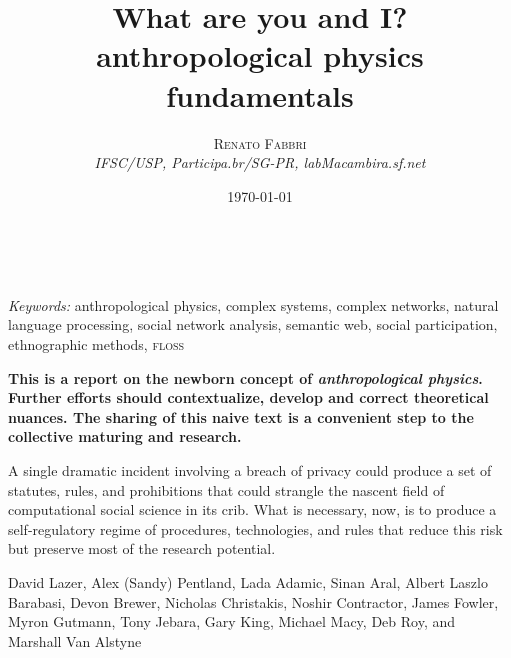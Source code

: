 \documentclass[a4paper, 11pt]{article} %
\title{\textbf{What are you and I?}\\ %
anthropological physics fundamentals} %
\author{\textsc{Renato Fabbri} %
\\{\textit{IFSC/USP, Participa.br/SG-PR, labMacambira.sf.net}}} %
\date{\today} %
\makeatletter
\newcommand{\floss}{\textsc{floss}}
\renewcommand{\maketitle}{ %
\begin{flushright} %
{\LARGE\@title} %

\vspace{50pt} %

{\large\@author} %
\\\@date %

\vspace{40pt} %
\end{flushright}
}
\makeatother
\begin{document}
\maketitle %



%
%
%

\hspace*{3,6mm}\textit{Keywords:} anthropological physics, complex systems, complex networks, natural language processing, social network analysis, semantic web, social participation, ethnographic methods, \floss


\vspace*{1cm}
{\bf This is a report on the newborn concept of \emph{anthropological physics}. Further efforts should contextualize, develop and correct theoretical nuances. The sharing of this naive text is a convenient step to the collective maturing and research.}
\vspace*{.6cm}

\newpage
\epigraph{A single dramatic incident involving a breach of privacy could produce a set of statutes, rules, and prohibitions that could strangle the nascent field of computational social science in its crib. What is necessary, now, is to produce a self-regulatory regime of procedures, technologies, and rules that reduce this risk but preserve most of the research potential.}{David Lazer, Alex (Sandy) Pentland, Lada Adamic, Sinan Aral, Albert Laszlo Barabasi, Devon Brewer, Nicholas Christakis, Noshir Contractor, James Fowler, Myron Gutmann, Tony Jebara, Gary King, Michael Macy, Deb Roy, and Marshall Van Alstyne~\cite{life}}
\end{document}
